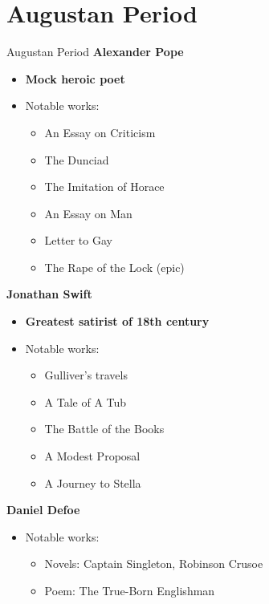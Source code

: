 \documentclass[
  12pt,
    progressbar=frametitle]{beamer}
\providecommand{\tightlist}{%
  \setlength{\itemsep}{0pt}\setlength{\parskip}{0pt}}
\begin{document}
\section{Augustan Period}
\begin{frame}[allowframebreaks]
{Augustan Period}
\large\textbf{Alexander Pope}\normalsize\vspace{-3mm}

\begin{itemize}
\tightlist
\item
  \textbf{Mock heroic poet}
\item
  Notable works:

  \begin{itemize}
  \tightlist
  \item
    An Essay on Criticism
  \item
    The Dunciad
  \item
    The Imitation of Horace
  \item
    An Essay on Man
  \item
    Letter to Gay
  \item
    The Rape of the Lock (epic)
  \end{itemize}
\end{itemize}

\large\textbf{Jonathan Swift}\normalsize\vspace{-3mm}

\begin{itemize}
\tightlist
\item
  \textbf{Greatest satirist of 18th century}
\item
  Notable works:

  \begin{itemize}
  \tightlist
  \item
    Gulliver's travels
  \item
    A Tale of A Tub
  \item
    The Battle of the Books
  \item
    A Modest Proposal
  \item
    A Journey to Stella
  \end{itemize}
\end{itemize}

\large\textbf{Daniel Defoe}\normalsize\vspace{-3mm}

\begin{itemize}
\tightlist
\item
  Notable works:

  \begin{itemize}
  \tightlist
  \item
    Novels: Captain Singleton, Robinson Crusoe
  \item
    Poem: The True-Born Englishman
  \end{itemize}
\end{itemize}
\end{frame}
\end{document}
